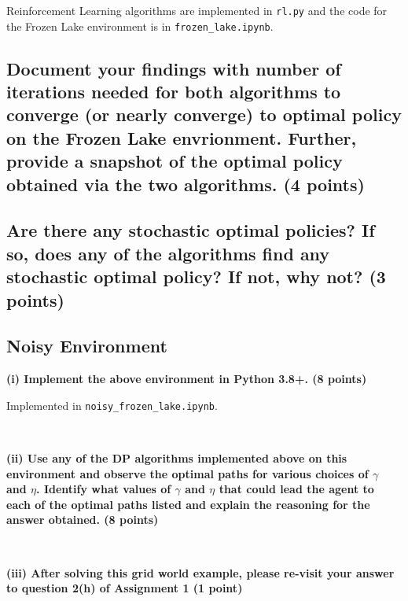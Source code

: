 \documentclass{article}
\begin{document}
Reinforcement Learning algorithms are implemented in \texttt{rl.py} and the code for the Frozen Lake environment is in \texttt{frozen\_lake.ipynb}.

\subsection{Document your findings with number of iterations needed for both algorithms to converge (or nearly converge) to optimal policy on the Frozen Lake envrionment. Further, provide a snapshot of the optimal policy obtained via the two algorithms. (4 points)}


\subsection{Are there any stochastic optimal policies? If so, does any of the algorithms find any stochastic optimal policy? If not, why not? (3 points)}

\subsection{Noisy Environment}

\textbf{(i) Implement the above environment in Python 3.8+. (8 points)}
\vspace*{2mm}

Implemented in \texttt{noisy\_frozen\_lake.ipynb}.

\,

\noindent
\textbf{(ii) Use any of the DP algorithms implemented above on this environment and observe the optimal paths for various choices of $\gamma$ and $\eta$. Identify what values of $\gamma$ and $\eta$ that could lead the agent to each of the optimal paths listed and explain the reasoning for the answer obtained. (8 points)} 

\,


\noindent
\textbf{(iii) After solving this grid world example, please re-visit your answer to question 2(h) of Assignment 1 (1 point)}
\end{document}
